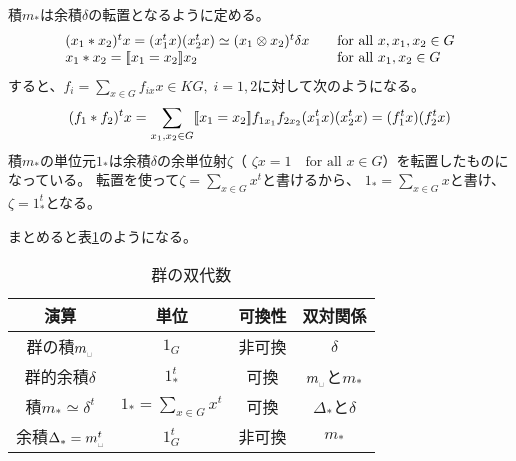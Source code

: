	積$m_*$は余積$\delta$の転置となるように定める。
	\begin{equation*}\begin{array}{ll} %
		(x_1*x_2)^tx = (x_1^tx)(x_2^tx) \simeq (x_1\otimes x_2)^t\delta x
			& \quad\text{for all }x,x_1,x_2\in G \\
		x_1*x_2 = \jump{x_1=x_2}x_2
			& \quad\text{for all }x_1,x_2\in G \\
	\end{array}\end{equation*} %
	すると、$f_i=\sum_{x\in G}f_{ix}x\in KG,\;i=1,2$に対して次のようになる。
	\begin{equation*}\begin{split} %
		(f_1*f_2)^tx 
		= \sum_{x_1,x_2\in G}\jump{x_1=x_2}f_{1x_1}f_{2x_2}(x_1^tx)(x_2^tx)
		= (f_1^tx)(f_2^tx)
	\end{split}\end{equation*} %
	積$m_*$の単位元$1_*$は余積$\delta$の余単位射$\zeta$（
	$\zeta x=1\quad\text{for all }x\in G$）を転置したものになっている。
	転置を使って$\zeta=\sum_{x\in G}x^t$と書けるから、
	$1_*=\sum_{x\in G}x$と書け、$\zeta=1_*^t$となる。

	まとめると表\ref{table:群の双代数}のようになる。
	\begin{table}[htbp]
		\begin{center}\begin{tabular}{cccc} \hline
			演算 & 単位 & 可換性 & 双対関係	\\ \hline
			群の積$m_\myspace$ & $1_G$ & 非可換 & $\delta$ \\
			群的余積$\delta$ & $1_*^t$ & 可換 & $m_\myspace$と$m_*$ \\
			積$m_*\simeq\delta^t$ & $1_*=\sum_{x\in G}x^t$ & 可換 
				& $\Delta_*$と$\delta$ \\
			余積$\Delta_*=m_\myspace^t$ & $1_G^t$ & 非可換 & $m_*$ \\
		\end{tabular}\end{center}
		\caption{群の双代数}\label{table:群の双代数}
	\end{table}

